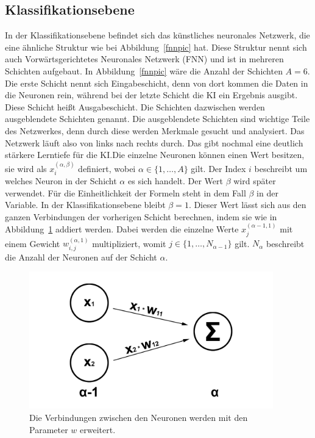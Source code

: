 \documentclass[11pt]{article}
\begin{document}
\subsection{Klassifikationsebene}\label{fcnn}
In der Klassifikationsebene befindet sich das künstliches neuronales Netzwerk, die eine ähnliche Struktur wie bei Abbildung~\ref{fnnpic} hat.
Diese Struktur nennt sich auch Vorwärtsgerichtetes Neuronales Netzwerk (FNN) und ist in mehreren Schichten aufgebaut. In Abbildung~\ref{fnnpic} wäre die Anzahl
der Schichten $A = 6$. Die erste Schicht nennt sich Eingabeschicht, denn von dort kommen die Daten in die Neuronen rein, während bei
der letzte Schicht die KI ein Ergebnis ausgibt. Diese Schicht heißt Ausgabeschicht. Die Schichten dazwischen werden ausgeblendete Schichten genannt.
Die ausgeblendete Schichten sind wichtige Teile des Netzwerkes, denn durch diese werden Merkmale gesucht und analysiert.
Das Netzwerk läuft also von links nach rechts durch. Das gibt nochmal
eine deutlich stärkere Lerntiefe für die KI.\@ Die einzelne Neuronen können einen Wert besitzen, sie wird als $ x_{i}^{(\alpha,\beta)} $ definiert,
wobei $ \alpha \in \{1,\ldots,A\} $ gilt. Der Index $i$ beschreibt um welches Neuron in der Schicht $\alpha$ es sich handelt. Der Wert $\beta$ wird später
verwendet. Für die Einheitlichkeit der Formeln steht in dem Fall $\beta$ in der Variable. In der Klassifikationsebene bleibt $\beta = 1$. Dieser Wert
lässt sich aus den ganzen Verbindungen der vorherigen Schicht berechnen, indem sie wie in Abbildung~\ref{connection} addiert werden. Dabei werden
die einzelne Werte $ x_{j}^{(\alpha-1,1)} $ mit einem Gewicht $ w_{i,j}^{(\alpha,1)} $ multipliziert, womit $ j \in \{1,\ldots,N_{\alpha-1}\} $ gilt.
$ N_{\alpha} $ beschreibt die Anzahl der Neuronen auf der Schicht $\alpha$.
\begin{figure}[h]
    \centering
    \includegraphics[width=300pt, keepaspectratio]{images/verbindung}
    \caption[Verbindungen zwischen den Neuronen]{Die Verbindungen zwischen den Neuronen werden mit den Parameter $w$ erweitert.}\label{connection}
\end{figure}
\end{document}
